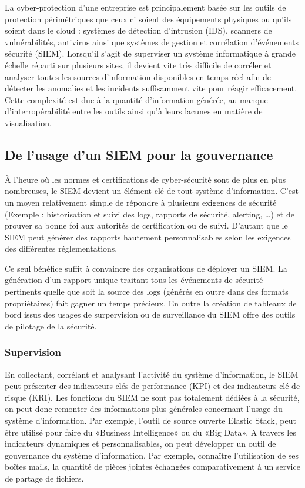 
La cyber-protection d'une entreprise est principalement basée sur les outils de protection périmétriques que ceux ci soient des équipements physiques ou qu'ils soient dans le cloud : systèmes de détection d’intrusion (IDS), scanners de vulnérabilités, antivirus ainsi que systèmes de gestion et corrélation d’événements sécurité (SIEM). Lorsqu’il s’agit de superviser un système informatique à grande échelle réparti sur plusieurs sites, il devient vite très difficile de corréler et analyser toutes les sources d’information disponibles en temps réel afin de détecter les anomalies et les incidents suffisamment vite pour réagir efficacement. Cette complexité est due à la quantité d’information générée, au manque d’interropérabilité entre les outils ainsi qu’à leurs lacunes en matière de visualisation.


\subsection {De l'usage d'un SIEM pour la gouvernance}  

À l’heure où les normes et certifications de cyber-sécurité sont de plus en plus nombreuses, le SIEM devient un élément clé de tout système d’information. C’est un moyen relativement simple de répondre à plusieurs exigences de sécurité (Exemple : historisation et suivi des logs, rapports de sécurité, alerting, …) et de prouver sa bonne foi aux autorités de certification ou de suivi. D’autant que le SIEM peut générer des rapports hautement personnalisables selon les exigences des différentes réglementations. 

Ce seul bénéfice suffit à convaincre des organisations de déployer un SIEM. La génération d’un rapport unique traitant tous les événements de sécurité pertinents quelle que soit la source des logs (générés en outre dans des formats propriétaires) fait gagner un temps précieux. En outre la création de tableaux de bord issus des usages de surpervision ou de surveillance du SIEM offre des outils de pilotage de la sécurité. 

\subsubsection{Supervision}
En collectant, corrélant et analysant l’activité du système d’information, le SIEM peut présenter des indicateurs clés de performance (KPI) et des indicateurs clé de risque (KRI).
Les fonctions du SIEM ne sont pas totalement dédiées à la sécurité, on peut donc remonter des informations plus générales concernant l’usage du système d’information. Par exemple, l’outil de source ouverte Elastic Stack, peut être utilisé pour faire du «Business Intelligence» ou du «Big Data». A travers les indicateurs dynamiques et personnalisables, on peut développer un outil de gouvernance du système d’information. Par exemple, connaître l’utilisation de ses boîtes mails, la quantité de pièces jointes échangées comparativement à un service de partage de fichiers.

